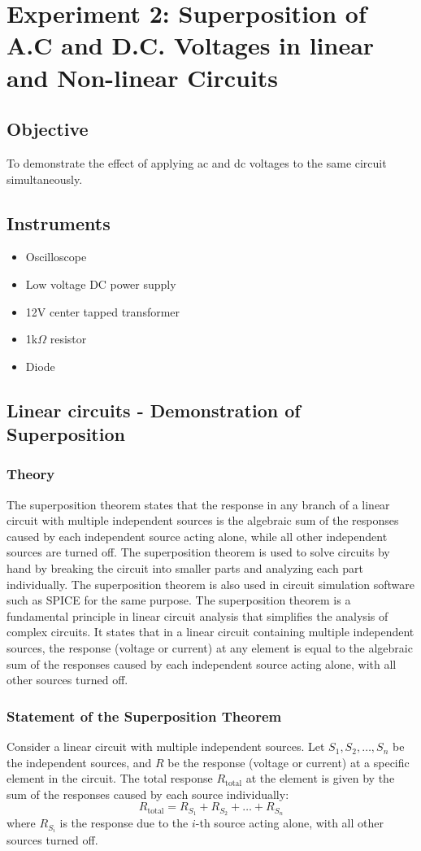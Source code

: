 \newpage
\section{Experiment 2: Superposition of A.C and D.C. Voltages in linear and Non-linear Circuits}
\subsection{Objective}
To demonstrate the effect of applying ac and dc voltages to the same circuit simultaneously.

\subsection {Instruments}
\begin{itemize}
\item Oscilloscope
\item Low voltage DC power supply
\item 12V center tapped transformer
\item 1k$\Omega$ resistor
\item Diode
\end{itemize}

\subsection{Linear circuits - Demonstration of Superposition}
\subsubsection*{Theory}
The superposition theorem states that the response in any branch of a linear circuit with multiple independent sources is the algebraic sum of the responses caused by each independent source acting alone, while all other independent sources are turned off. The superposition theorem is used to solve circuits by hand by breaking the circuit into smaller parts and analyzing each part individually. The superposition theorem is also used in circuit simulation software such as SPICE for the same purpose.
The superposition theorem is a fundamental principle in linear circuit analysis that simplifies the analysis of complex circuits. It states that in a linear circuit containing multiple independent sources, the response (voltage or current) at any element is equal to the algebraic sum of the responses caused by each independent source acting alone, with all other sources turned off.
\subsubsection*{Statement of the Superposition Theorem}
Consider a linear circuit with multiple independent sources. Let \(S_1, S_2, \ldots, S_n\) be the independent sources, and \(R\) be the response (voltage or current) at a specific element in the circuit.
The total response \(R_{\text{total}}\) at the element is given by the sum of the responses caused by each source individually:
\[
R_{\text{total}} = R_{S_1} + R_{S_2} + \ldots + R_{S_n}
\]
where \(R_{S_i}\) is the response due to the \(i\)-th source acting alone, with all other sources turned off.
